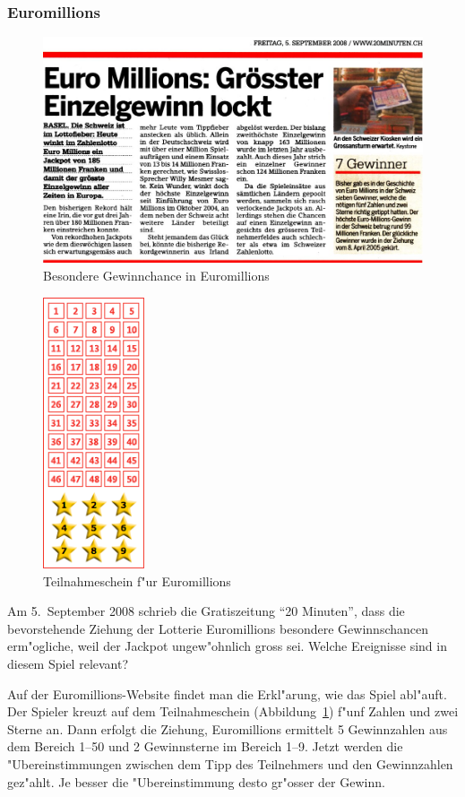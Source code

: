 \subsubsection{Euromillions}
\begin{figure}
\includegraphics[width=\hsize]{graphics/euromillions}
\caption{Besondere Gewinnchance in Euromillions}
\end{figure}
\begin{figure}
\begin{center}
\includegraphics[height=8cm]{graphics/euromillionsschein}
\end{center}
\caption{Teilnahmeschein f"ur Euromillions\label{euromillionsschein}}
\end{figure}
Am 5.~September 2008 schrieb die Gratiszeitung ``20 Minuten'', dass die
bevorstehende Ziehung der Lotterie Euromillions besondere Gewinnschancen 
erm"ogliche, weil der Jackpot ungew"ohnlich gross sei. Welche Ereignisse
sind in diesem Spiel relevant?

Auf der Euromillions-Website findet man die Erkl"arung, wie das Spiel abl"auft.
Der Spieler kreuzt auf dem Teilnahmeschein (Abbildung~\ref{euromillionsschein})
f"unf Zahlen und zwei Sterne an. Dann erfolgt die Ziehung, Euromillions ermittelt
5 Gewinnzahlen aus dem Bereich 1--50 und 2 Gewinnsterne im Bereich 1--9.
Jetzt werden die "Ubereinstimmungen zwischen dem Tipp des Teilnehmers und den
Gewinnzahlen gez"ahlt. Je besser die "Ubereinstimmung desto gr"osser der Gewinn.

